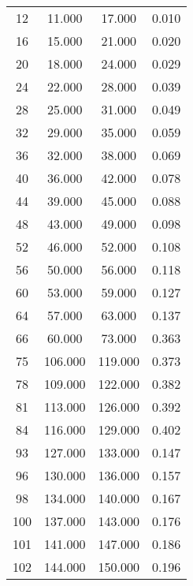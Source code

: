 % 
\begin{tabular}{cccc}
  \hline
  \hline
12 & 11.000 & 17.000 & 0.010 \\ 
  16 & 15.000 & 21.000 & 0.020 \\ 
  20 & 18.000 & 24.000 & 0.029 \\ 
  24 & 22.000 & 28.000 & 0.039 \\ 
  28 & 25.000 & 31.000 & 0.049 \\ 
  32 & 29.000 & 35.000 & 0.059 \\ 
  36 & 32.000 & 38.000 & 0.069 \\ 
  40 & 36.000 & 42.000 & 0.078 \\ 
  44 & 39.000 & 45.000 & 0.088 \\ 
  48 & 43.000 & 49.000 & 0.098 \\ 
  52 & 46.000 & 52.000 & 0.108 \\ 
  56 & 50.000 & 56.000 & 0.118 \\ 
  60 & 53.000 & 59.000 & 0.127 \\ 
  64 & 57.000 & 63.000 & 0.137 \\ 
  66 & 60.000 & 73.000 & 0.363 \\ 
  75 & 106.000 & 119.000 & 0.373 \\ 
  78 & 109.000 & 122.000 & 0.382 \\ 
  81 & 113.000 & 126.000 & 0.392 \\ 
  84 & 116.000 & 129.000 & 0.402 \\ 
  93 & 127.000 & 133.000 & 0.147 \\ 
  96 & 130.000 & 136.000 & 0.157 \\ 
  98 & 134.000 & 140.000 & 0.167 \\ 
  100 & 137.000 & 143.000 & 0.176 \\ 
  101 & 141.000 & 147.000 & 0.186 \\ 
  102 & 144.000 & 150.000 & 0.196 \\ 
   \hline
\end{tabular}

